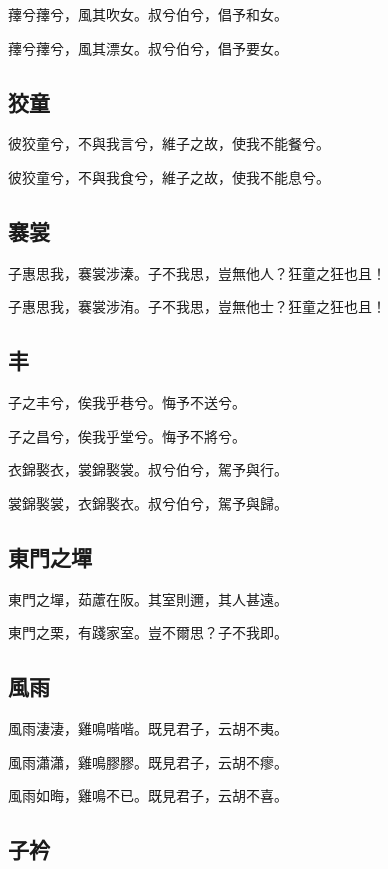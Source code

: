 蘀兮蘀兮，風其吹女。叔兮伯兮，倡予和女。

蘀兮蘀兮，風其漂女。叔兮伯兮，倡予要女。

\subsection[狡童]{狡童}

彼狡童兮，不與我言兮，維子之故，使我不能餐兮。

彼狡童兮，不與我食兮，維子之故，使我不能息兮。

\subsection[褰裳]{褰裳}

子惠思我，褰裳涉溱。子不我思，豈無他人？狂童之狂也且！

子惠思我，褰裳涉洧。子不我思，豈無他士？狂童之狂也且！

\subsection[丰]{丰}

子之丰兮，俟我乎巷兮。悔予不送兮。

子之昌兮，俟我乎堂兮。悔予不將兮。

衣錦褧衣，裳錦褧裳。叔兮伯兮，駕予與行。

裳錦褧裳，衣錦褧衣。叔兮伯兮，駕予與歸。

\subsection[東門之墠]{東門之墠}

東門之墠，茹藘在阪。其室則邇，其人甚遠。

東門之栗，有踐家室。豈不爾思？子不我即。

\subsection[風雨]{風雨}

風雨淒淒，雞鳴喈喈。既見君子，云胡不夷。

風雨瀟瀟，雞鳴膠膠。既見君子，云胡不瘳。

風雨如晦，雞鳴不已。既見君子，云胡不喜。

\subsection[子衿]{子衿}

